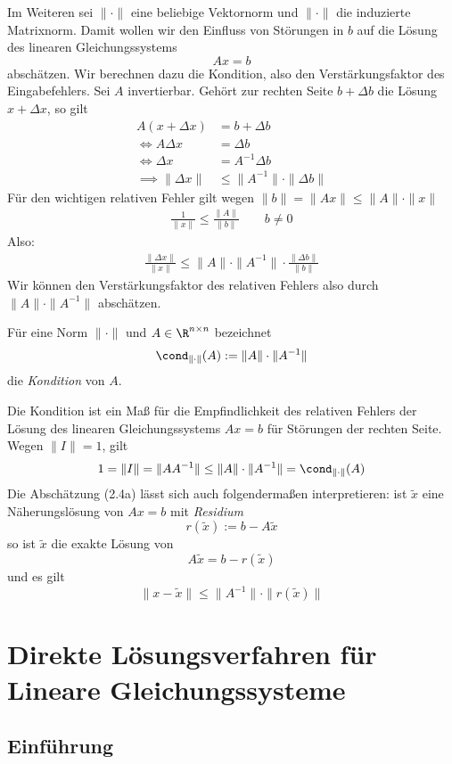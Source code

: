 \documentclass[a4paper]{scrartcl}
\numberwithin{equation}{section}
\begin{document}
Im Weiteren sei $\|\cdot\|$ eine beliebige Vektornorm und $\|\cdot\|$ die induzierte Matrixnorm.
Damit wollen wir den Einfluss von Störungen in $b$ auf die Lösung des linearen Gleichungssystems
\[
Ax=b
\]
abschätzen.
Wir berechnen dazu die Kondition, also den Verstärkungsfaktor des Eingabefehlers.
Sei $A$ invertierbar.
Gehört zur rechten Seite $b+\Delta b$ die Lösung $x+\Delta x$, so gilt
\begin{align*}
A(x+\Delta x)&=b+\Delta b\\
\iff A\Delta x &= \Delta b\\
\iff \Delta x &= A^{-1}\Delta b\\
\implies \|\Delta x\|&\le \|A^{-1}\|\cdot \|\Delta b\| \tag{2.4a}
\end{align*}
Für den wichtigen relativen Fehler gilt wegen $\|b\| = \|Ax\| \le\|A\|\cdot\|x\|$
\begin{align*}
\frac 1{\|x\|}\le \frac {\|A\|}{\|b\|} \qquad b\neq 0
\end{align*}
Also:
\begin{align*}
\frac{\|\Delta x\|}{\|x\|} \le \|A\|\cdot \|A^{-1}\|\cdot \frac{\|\Delta b\|}{\|b\|} \tag{2.4b}
\end{align*}
Wir können den Verstärkungsfaktor des relativen Fehlers also durch $\|A\|\cdot\|A^{-1}\|$ abschätzen.

\begin{df}
\label{df:2.14}
Für eine Norm $\|\cdot\|$ und $A\in \R^{n\times n}$ bezeichnet
\[
\cond_{\|\cdot\|}(A) := \|A\|\cdot\|A^{-1}\|
\]
die \emph{Kondition} von $A$.

Die Kondition ist ein Maß für die Empfindlichkeit des relativen Fehlers der Lösung des linearen Gleichungssystems $Ax=b$ für Störungen der rechten Seite.
Wegen $\|I\|=1$, gilt
\[
1=\|I\|=\|AA^{-1}\|\le \|A\|\cdot\|A^{-1}\|=\cond_{\|\cdot\|}(A)
\]
Die Abschätzung (2.4a) lässt sich auch folgendermaßen interpretieren:
ist $\tilde x$ eine Näherungslösung von $Ax=b$ mit \emph{Residium}
\[
r(\tilde x) := b -A\tilde x
\]
so ist $\tilde x$ die exakte Lösung von
\[
A\tilde x = b -r(\tilde x)
\]
und es gilt
\[
\|x-\tilde x\| \le \|A^{-1}\| \cdot \|r(\tilde x)\|
\]

\end{df}

\section{Direkte Lösungsverfahren für Lineare Gleichungssysteme}
\subsection{Einführung}
\end{document}
